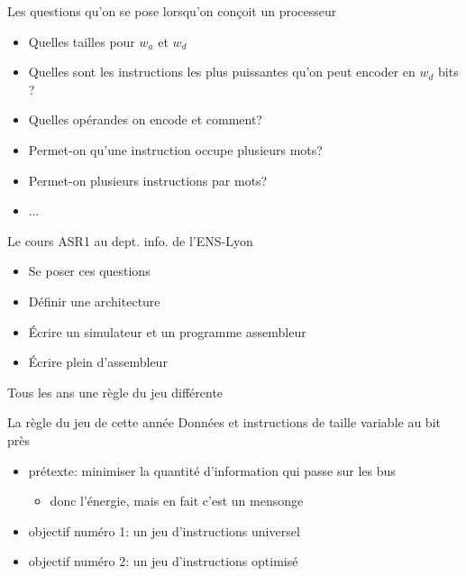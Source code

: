 \documentclass[slidetop,11pt,table]{beamer}
\begin{document}
\begin{frame}{Les questions qu'on se pose lorsqu'on conçoit un processeur}
  \begin{itemize}
  \item Quelles tailles pour $w_a$ et $w_d$
  \item Quelles sont les instructions les plus puissantes qu'on peut encoder en $w_d$ bits ?
  \item Quelles opérandes on encode et comment?
    
  \item Permet-on qu'une instruction occupe plusieurs mots?
  \item Permet-on plusieurs instructions par mots?
  \item ...
    
  \end{itemize}
\end{frame}

\begin{frame}{Le cours ASR1 au dept. info. de l'ENS-Lyon}
  \begin{itemize}
  \item Se poser ces questions
  \item Définir une architecture
  \item Écrire un simulateur et un programme assembleur
  \item Écrire plein d'assembleur
  \end{itemize}
  Tous les ans une règle du jeu différente 
\end{frame}



\begin{frame}{La règle du jeu de cette année}
Données et instructions de taille variable au bit près
  \begin{itemize}
  \item prétexte: minimiser la quantité d'information qui passe sur les bus
    \begin{itemize}
    \item donc l'énergie, mais en fait c'est un mensonge
    \end{itemize}
  \item objectif numéro 1: un jeu d'instructions universel
  \item objectif numéro 2: un jeu d'instructions optimisé
  \end{itemize}
\end{frame}
\end{document}
